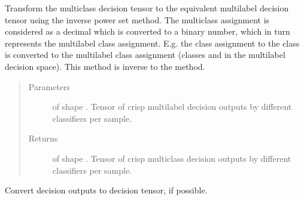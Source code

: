 \documentclass[letterpaper,10pt,english]{sphinxmanual}
\begin{document}
\begin{fulllineitems}
\label{\detokenize{pusion.util.transformer:pusion.util.transformer.multiclass_to_multilabel_assignments}}
\sphinxAtStartPar
Transform the multiclass decision tensor to the equivalent multilabel decision tensor using the inverse
power set method. The multiclass assignment is considered as a decimal which is converted to a binary number, which
in turn represents the multilabel class assignment. E.g. the class assignment to the class  \sphinxtitleref{({[}0,0,0,1{]})} is
converted to the multilabel class assignment \sphinxtitleref{{[}1,1{]}} (classes  and  in the multilabel decision space).
This method is inverse to the  method.
\begin{quote}\begin{description}
\item[{Parameters}] \leavevmode
\sphinxAtStartPar
{} \textendash{}  of shape .
Tensor of crisp multilabel decision outputs by different classifiers per sample.

\item[{Returns}] \leavevmode
\sphinxAtStartPar
{} of shape .
Tensor of crisp multiclass decision outputs by different classifiers per sample.

\end{description}\end{quote}

\end{fulllineitems}


\begin{fulllineitems}
\label{\detokenize{pusion.util.transformer:pusion.util.transformer.tensorize}}
\sphinxAtStartPar
Convert  decision outputs to  decision tensor, if possible.

\end{fulllineitems}
\end{document}
